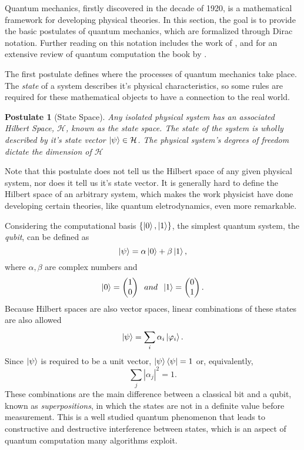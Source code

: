 \documentclass[../../dissertation.tex]{subfiles}
\newtheorem{post}{Postulate}
\begin{document}
Quantum mechanics, firstly discovered in the decade of 1920, is a mathematical
framework for developing physical theories. In this section, the goal is to
provide the basic postulates of quantum mechanics, which are formalized through
Dirac notation. Further reading on this notation includes the work of
\cite{sakurai1994}, and for an extensive review of quantum computation the
book by \cite{nielsen2011}.\par  
The first postulate defines where the processes of quantum mechanics take
place. The \textit{state} of a system describes it's physical characteristics,
so some rules are required for these mathematical objects to have a connection
to the real world.
\begin{post}[State Space] 
	Any isolated physical system has an associated Hilbert Space,
	$\mathcal{H}$, known as the state space. The state of the system is
	wholly described by it's state vector $\ket{\psi} \in \mathcal{H}$. The
	physical system's degrees of freedom dictate the dimension of
	$\mathcal{H}$\par
\end{post}
Note that this postulate does not tell us the Hilbert space of any given
physical system, nor does it tell us it's state vector. It is generally hard to
define the Hilbert space of an arbitrary system, which makes the work physicist
have done developing certain theories, like quantum eletrodynamics, even more
remarkable.\par 
Considering the computational basis $\{\ket{0},\ket{1}\}$, the simplest quantum
system, the \textit{qubit}, can be defined as 
\begin{equation}
	\ket{\psi} = \alpha \ket{0} + \beta \ket{1},
\end{equation}
where $\alpha,\beta$ are complex numbers and
\begin{equation}
	\ket{0} = \begin{pmatrix} 1 \\0 \end{pmatrix}  \; \; and  \;  \;  \ket{1} = \begin{pmatrix} 0 \\1 \end{pmatrix}.
\end{equation}
Because Hilbert spaces are also vector spaces, linear combinations of these
states are also allowed 
\begin{equation}
	\ket{\psi} = \sum_i \alpha_i \ket{\varphi_i}.
\end{equation}
Since $\ket{\psi}$ is required to be a unit vector, $\ket{\psi}\bra{\psi}=1$ or, equivalently,
\begin{equation}
	\sum_j | \alpha_j |^2 = 1 .
\end{equation}
These combinations are the main difference between a classical bit and a qubit,
known as \textit{superpositions}, in which the states are not in a definite
value before measurement. This is a well studied quantum phenomenon that leads
to constructive and destructive interference between states, which is an aspect
of quantum computation many algorithms exploit.\par
\end{document}

